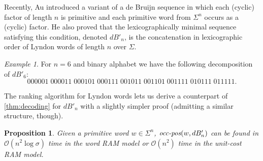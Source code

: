 \documentclass{article}
\newcommand{\Oh}{\mathcal{O}}
\newcommand{\dB}{dB}
\newcommand{\occ}{\mbox{\it occ-pos}}
\newtheorem{proposition}[theorem]{Proposition}
\theoremstyle{definition}
\theoremstyle{remark}
\newtheorem{example}[theorem]{Example}
\begin{document}
Recently, Au \cite{DBLP:journals/dm/Au15} introduced a variant of a de Bruijn sequence
in which each (cyclic) factor of length $n$ is primitive and each primitive word from $\Sigma^n$ occurs as a (cyclic) factor.
He also proved that the lexicographically minimal sequence satisfying this condition,
denoted $\dB'_n$, is the concatenation in lexicographic order of Lyndon words of length $n$ over $\Sigma$.

\begin{example}
  For $n=6$ and binary alphabet we have the following decomposition of $\dB'_6$:
{ $$  000001\; 000011\; 000101\; 000111\;  001011\;
  001101\; 001111\;  010111\; 011111.$$
}
\end{example}

The ranking algorithm for Lyndon words lets us derive a counterpart of \cref{thm:decoding}
for $\dB'_n$ with a slightly simpler proof (admitting a similar structure, though).
\begin{proposition}\label{prop:decoding2}
Given a primitive word $w \in \Sigma^n$, $\occ(w,\dB'_n)$
  can be found in $\Oh(n^2\log\sigma)$ time in the word RAM model or $\Oh(n^2)$ time in the unit-cost RAM model.
\end{proposition}
\end{document}
